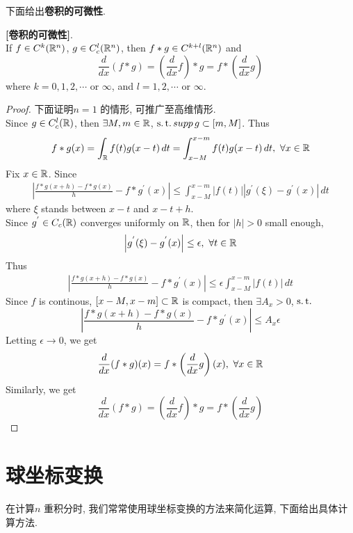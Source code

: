 	\vspace{4em}
	
	下面给出\textbf{卷积的可微性}. 
	\begin{proposition}\label{prop A.5.1}
		\textbf{[卷积的可微性]}. \\
		If $f \in C^{k}(\mathbb{R}^n)$, $g \in C_{c}^{l}(\mathbb{R}^n)$, then $f * g \in C^{k + l}(\mathbb{R}^n)$ and
		\[ \frac{d}{dx}(f * g) = \left( \frac{d}{dx} f \right) * g = f * \left( \frac{d}{dx} g \right) \]
		where $k = 0 , 1 , 2 , \cdots$ or $\infty$, and $l = 1 , 2 , \cdots$ or $\infty$.
		
		\vspace{6em}
		
		\begin{proof}
			下面证明$n = 1$ 的情形, 可推广至高维情形. \\
			Since $g \in C_{c}^{l}(\mathbb{R})$, then $\exists M , m \in \mathbb{R}$, $\operatorname{s.t.} supp \, g \subset [m , M]$. Thus
			\[ f*g (x) 
			= \int_{\mathbb{R}} f(t) g(x - t) \, dt 
			= \int_{x - M}^{x - m} f(t) g(x - t) \, dt , \,\, \forall x \in \mathbb{R} \]
			Fix $x \in \mathbb{R}$. Since
			\begin{align}
				\left| \frac{f*g (x + h) - f*g(x)}{h} - f* g^{'}(x) \right| 
				\leq \int_{x - M}^{x - m} \left| f(t) \right| \left| g^{'}(\xi) - g^{'}(x) \right| \, dt
			\end{align}
			where $\xi$ stands between $x - t$ and $x - t + h$. \\
			Since $g^{'} \in C_{c}(\mathbb{R})$ converges uniformly on $\mathbb{R}$, then for $\left| h \right| > 0$ small enough, 
			\[ \left| g^{'}(\xi) - g^{'}(x) \right| \leq \epsilon , \,\, \forall t \in \mathbb{R} \]
			Thus
			\begin{align}
				\left| \frac{f*g (x + h) - f*g(x)}{h} - f* g^{'}(x) \right| 
				\leq \epsilon \int_{x - M}^{x - m} \left| f(t) \right| \, dt
			\end{align}
			Since $f$ is continous, $[x - M , x - m] \subset \mathbb{R}$ is compact, then $\exists A_x > 0$, $\operatorname{s.t.}$
			\[ \left| \frac{f*g (x + h) - f*g(x)}{h} - f* g^{'}(x) \right| \leq A_x \epsilon \]
			Letting $\epsilon \to 0$, we get
			\[ \frac{d}{dx}(f * g)(x) = f * \left( \frac{d}{dx} g \right) (x) , \,\, \forall x \in \mathbb{R}  \]
			Similarly, we get
			\[ \frac{d}{dx}(f * g) = \left( \frac{d}{dx} f \right) * g = f * \left( \frac{d}{dx} g \right) \]
		\end{proof}
	\end{proposition}

\newpage

\section{球坐标变换}
	在计算$n$ 重积分时, 我们常常使用球坐标变换的方法来简化运算, 下面给出具体计算方法. 
	
